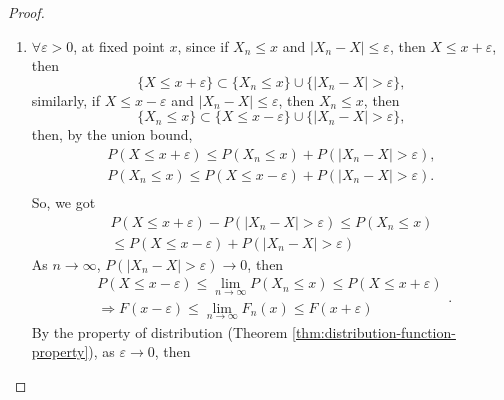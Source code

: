 \begin{proof}
	\begin{enumerate}
		\item $\forall\varepsilon>0$, at fixed point $x$, since if $X_n\leq x$ and $|X_n-X|\leq\varepsilon$, then $X\leq x+\varepsilon$, then
		      \begin{equation*}
			      \{X\leq x+\varepsilon\}\subset\{X_n\leq x\}\cup\{|X_n-X|>\varepsilon\},
		      \end{equation*}
		      similarly, if $X\leq x-\varepsilon$ and $|X_n-X|\leq\varepsilon$, then $X_n\leq x$, then
		      \begin{equation*}
			      \{X_n\leq x\}\subset\{X\leq x-\varepsilon\}\cup\{|X_n-X|>\varepsilon\},
		      \end{equation*}
		      then, by the union bound,
		      \begin{equation*}
			      \begin{gathered}
				      P\left(X\leq x+\varepsilon\right)\leq P\left(X_n\leq x\right)+P\left(|X_n-X|>\varepsilon\right),\\
				      P\left(X_n\leq x\right)\leq P\left(X\leq x-\varepsilon\right)+P\left(|X_n-X|>\varepsilon\right).\\
			      \end{gathered}
		      \end{equation*}
		      So, we got
		      \begin{equation*}
			      \begin{gathered}
				      P\left(X\leq x+\varepsilon\right)-P\left(|X_n-X|>\varepsilon\right)\leq P\left(X_n\leq x\right) \\
				      \leq P\left(X\leq x-\varepsilon\right)+P\left(|X_n-X|>\varepsilon\right)
			      \end{gathered}
		      \end{equation*}
		      As $n\rightarrow\infty$, $P\left(|X_n-X|>\varepsilon\right)\rightarrow 0$, then
		      \begin{equation*}
			      \begin{gathered}
				      P\left(X\leq x-\varepsilon\right)\leq\lim_{n\rightarrow\infty}P\left(X_n\leq x\right)\leq P\left(X\leq x+\varepsilon\right) \\
				      \Rightarrow F(x-\varepsilon)\leq \lim_{n\rightarrow\infty}F_n(x)\leq F(x+\varepsilon)
			      \end{gathered}.
		      \end{equation*}
		      By the property of distribution (Theorem \ref{thm:distribution-function-property}), as $\varepsilon\rightarrow 0$, then

\end{enumerate}
\end{proof}
